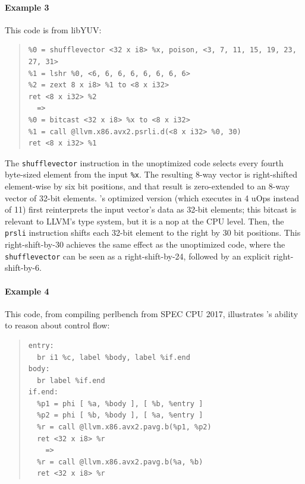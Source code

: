 \paragraph*{Example 3}

This code is from libYUV:

{\small\begin{quote}\begin{verbatim}
%0 = shufflevector <32 x i8> %x, poison, <3, 7, 11, 15, 19, 23, 27, 31>
%1 = lshr %0, <6, 6, 6, 6, 6, 6, 6, 6>
%2 = zext 8 x i8> %1 to <8 x i32>
ret <8 x i32> %2
  =>
%0 = bitcast <32 x i8> %x to <8 x i32>
%1 = call @llvm.x86.avx2.psrli.d(<8 x i32> %0, 30)
ret <8 x i32> %1
\end{verbatim}
\end{quote}}

The \texttt{shufflevector} instruction in the unoptimized code selects
every fourth byte-sized element from the input \texttt{\%x}.
%
The resulting 8-way vector is right-shifted element-wise by six bit
positions, and that result is zero-extended to an 8-way vector of
32-bit elements.
%
\minotaur's optimized version (which executes in 4 uOps instead of 11)
first reinterprets the input vector's data as 32-bit elements; this
bitcast is relevant to LLVM's type system, but it is a nop at the CPU
level.
%
Then, the \texttt{prsli} instruction shifts each 32-bit element to the
right by 30 bit positions.
%
This right-shift-by-30 achieves the same effect as the unoptimized
code, where the \texttt{shufflevector} can be seen as a
right-shift-by-24, followed by an explicit right-shift-by-6.

\paragraph*{Example 4}

This code, from compiling perlbench from SPEC CPU 2017, illustrates
\minotaur's ability to reason about control flow:

{\small\begin{quote}\begin{verbatim}
entry:
  br i1 %c, label %body, label %if.end
body:
  br label %if.end
if.end:
  %p1 = phi [ %a, %body ], [ %b, %entry ]
  %p2 = phi [ %b, %body ], [ %a, %entry ]
  %r = call @llvm.x86.avx2.pavg.b(%p1, %p2)
  ret <32 x i8> %r
    =>
  %r = call @llvm.x86.avx2.pavg.b(%a, %b)
  ret <32 x i8> %r
\end{verbatim}
\end{quote}}

